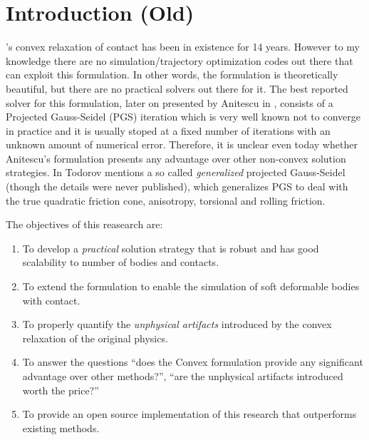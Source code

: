 



\section{Introduction (Old)}

's convex relaxation of contact
\cite{bib:anitescu2006} has been in existence for 14 years. However to my
knowledge there are no simulation/trajectory optimization codes out there that
can exploit this formulation. In other words, the formulation is theoretically
beautiful, but there are no practical solvers out there for it. The best
reported solver for this formulation, later on presented by Anitescu in
\cite{bib:anitescu2010, bib:tasora2011}, consists of a Projected Gauss-Seidel
(PGS) iteration which is very well known not to converge in practice and it is
usually stoped at a fixed number of iterations with an unknown amount of
numerical error. Therefore, it is unclear even today whether Anitescu's
formulation presents any advantage over other non-convex solution strategies. In
\cite{bib:todorov2014} Todorov mentions a so called \textit{generalized}
projected Gauss-Seidel (though the details were never published), which
generalizes PGS to deal with the true quadratic friction cone, anisotropy,
torsional and rolling friction.

The objectives of this reasearch are:
\begin{enumerate}
	\item To develop a \textit{practical} solution strategy that is robust and
	has good scalability to number of bodies and contacts.
	\item To extend the formulation to enable the simulation of soft deformable
	bodies with contact.
	\item To properly quantify the \textit{unphysical artifacts} introduced by
	the convex relaxation of the original physics.
	\item To answer the questions ``does the Convex formulation provide any
	significant advantage over other methods?'', ``are the unphysical artifacts
	introduced worth the price?''
	\item To provide an open source implementation of this research that
	outperforms existing methods.
\end{enumerate}

